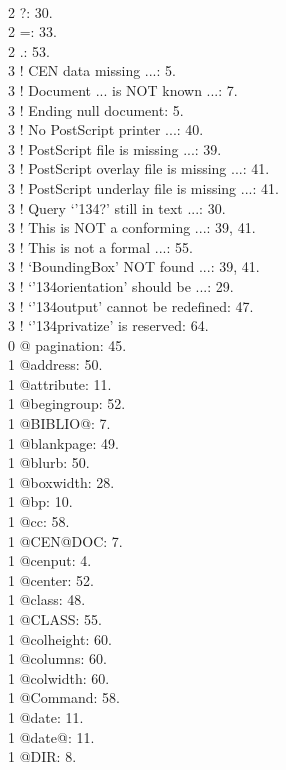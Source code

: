 \noprivatize
\index
\\2 ?: 30.
\\2 =: 33.
\\2 .: 53.
\newletter{!}
\\3 ! CEN data missing ...: 5.
\\3 ! Document ... is NOT known ...: 7.
\\3 ! Ending null document: 5.
\\3 ! No PostScript printer ...: 40.
\\3 ! PostScript file is missing ...: 39.
\\3 ! PostScript overlay file is missing ...: 41.
\\3 ! PostScript underlay file is missing ...: 41.
\\3 ! Query `\char '134?' still in text ...: 30.
\\3 ! This is NOT a conforming ...: 39, 41.
\\3 ! This is not a formal ...: 55.
\\3 ! `BoundingBox' NOT found ...: 39, 41.
\\3 ! `\char '134orientation' should be ...: 29.
\\3 ! `\char '134output' cannot be redefined: 47.
\\3 ! `\char '134privatize' is reserved: 64.
\\0 @ pagination: 45.
\\1 @address: 50.
\\1 @attribute: 11.
\\1 @begingroup: 52.
\\1 @BIBLIO@: 7.
\\1 @blankpage: 49.
\\1 @blurb: 50.
\\1 @boxwidth: 28.
\\1 @bp: 10.
\\1 @cc: 58.
\\1 @CEN@DOC: 7.
\\1 @cenput: 4.
\\1 @center: 52.
\\1 @class: 48.
\\1 @CLASS: 55.
\\1 @colheight: 60.
\\1 @columns: 60.
\\1 @colwidth: 60.
\\1 @Command: 58.
\\1 @date: 11.
\\1 @date@: 11.
\\1 @DIR: 8.
